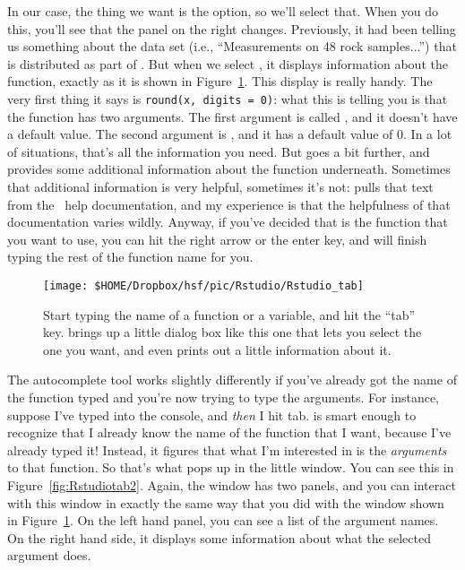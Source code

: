 In our case, the thing we want is the  option, so we'll select that. When you do this, you'll see that the panel on the right changes. Previously, it had been telling us something about the  data set (i.e., ``Measurements on 48 rock samples...'') that is distributed as part of \R. But when we select , it displays information about the  function, exactly as it is shown in Figure~\ref{fig:Rstudiotab}. This display is really handy. The very first thing it says is \texttt{round(x, digits = 0)}: what this is telling you is that the  function has two arguments. The first argument is called , and it doesn't have a default value. The second argument is , and it has a default value of 0. In a lot of situations, that's all the information you need. But \Rstudio goes a bit further, and provides some additional information about the function underneath. Sometimes that additional information is very helpful, sometimes it's not: \Rstudio pulls that text from the \R\ help documentation, and my experience is that the helpfulness of that documentation varies wildly. Anyway, if you've decided that  is the function that you want to use, you can hit the right arrow or the enter key, and \Rstudio will finish typing the rest of the function name for you. 

\begin{figure}[t]
\begin{center}
		\texttt{[image: \$HOME/Dropbox/hsf/pic/Rstudio/Rstudio\_tab]}
\caption{Start typing the name of a function or a variable, and hit the ``tab'' key. \Rstudio brings up a little dialog box like this one that lets you select the one you want, and even prints out a little information about it.}
\label{fig:Rstudiotab}
\end{center}
\end{figure}

The \Rstudio autocomplete tool works slightly differently if you've already got the name of the function typed and you're now trying to type the arguments. For instance, suppose I've typed  into the console, and {\it then} I hit tab. \Rstudio is smart enough to recognize that I already know the name of the function that I want, because I've already typed it! Instead, it figures that what I'm interested in is the {\it arguments} to that function. So that's what pops up in the little window. You can see this in Figure~\ref{fig:Rstudiotab2}. Again, the window has two panels, and you can interact with this window in exactly the same way that you did with the window shown in Figure~\ref{fig:Rstudiotab}. On the left hand panel, you can see a list of the argument names. On the right hand side, it displays some information about what the selected argument does. 


